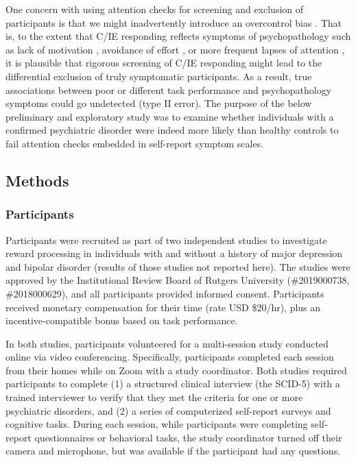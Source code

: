 \documentclass[a4paper,notitlepage,12pt]{article}
\begin{document}
One concern with using attention checks for screening and exclusion of participants is that we might inadvertently introduce an overcontrol bias \cite{elwert2014endogenous-2}. That is, to the extent that C/IE responding reflects symptoms of psychopathology such as lack of motivation \cite{barch2015mechanisms-2}, avoidance of effort \cite{cohen2001impairments-2, culbreth2016negative-2}, or more frequent lapses of attention \cite{kane2016individual-2, robison2017neurotic-2}, it is plausible that rigorous screening of C/IE responding might lead to the differential exclusion of truly symptomatic participants. As a result, true associations between poor or different task performance and psychopathology symptoms could go undetected (type II error). The purpose of the below preliminary and exploratory study was to examine whether individuals with a confirmed psychiatric disorder were indeed more likely than healthy controls to fail attention checks embedded in self-report symptom scales.  

\subsection*{Methods}

\subsubsection*{Participants}

Participants were recruited as part of two independent studies to investigate reward processing in individuals with and without a history of major depression and bipolar disorder (results of those studies not reported here). The studies were approved by the Institutional Review Board of Rutgers University (\#2019000738, \#2018000629), and all participants provided informed consent. Participants received monetary compensation for their time (rate USD \$20/hr), plus an incentive-compatible bonus based on task performance. 

In both studies, participants volunteered for a multi-session study conducted online via video conferencing. Specifically, participants completed each session from their homes while on Zoom with a study coordinator. Both studies required participants to complete (1) a structured clinical interview (the SCID-5) with a trained interviewer to verify that they met the criteria for one or more psychiatric disorders, and (2) a series of computerized self-report surveys and cognitive tasks. During each session, while participants were completing self-report questionnaires or behavioral tasks, the study coordinator turned off their camera and microphone, but was available if the participant had any questions. 
\end{document}
